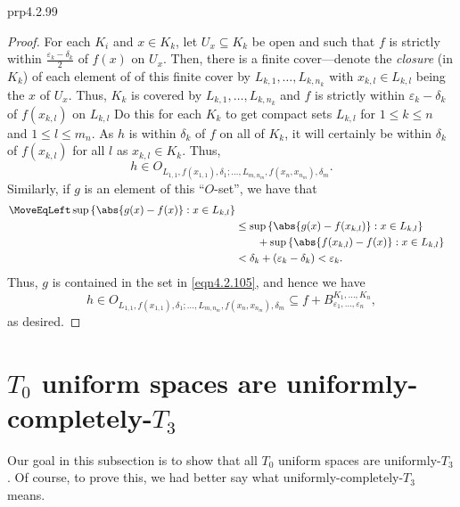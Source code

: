 \begin{prp}{}{prp4.2.99}
\begin{proof}
		For each $K_i$ and $x\in K_k$, let $U_x\subseteq K_k$ be open and such that $f$ is strictly within $\tfrac{\varepsilon _k-\delta _k}{2}$ of $f(x)$ on $U_x$.  Then, there is a finite cover---denote the \emph{closure} (in $K_k$) of each element of of this finite cover by $L_{k,1},\ldots ,L_{k,n_k}$ with $x_{k,l}\in L_{k,l}$ being the $x$ of $U_x$.  Thus, $K_k$ is covered by $L_{k,1},\ldots ,L_{k,n_k}$ and $f$ is strictly within $\varepsilon _k-\delta _k$ of $f(x_{k,l})$ on $L_{k,l}$  Do this for each $K_k$ to get compact sets $L_{k,l}$ for $1\leq k\leq n$ and $1\leq l\leq m_n$.  As $h$ is within $\delta _k$ of $f$ on all of $K_k$, it will certainly be within $\delta _k$ of $f(x_{k,l})$ for all $l$ as $x_{k,l}\in K_k$.  Thus,
		\begin{equation}\label{2.4.11}
			h\in O_{L_{1,1},f(x_{1,1}),\delta _1;\ldots ,L_{m,n_m},f(x_n,x_{n_m}),\delta _m}.
		\end{equation}
		Similarly, if $g$ is an element of this ``$O$-set'', we have that
		\begin{equation}
			\begin{split}
				\MoveEqLeft
				\sup \left\{ \abs{g(x)-f(x)}:x\in L_{k,l}\right\} \\
				& \leq \sup \left\{ \abs{g(x)-f(x_{k,l})}:x\in L_{k,l}\right\} \\ & \qquad +\sup \left\{ \abs{f(x_{k,l})-f(x)}:x\in L_{k,l}\right\} \\
				& <\delta _k+(\varepsilon _k-\delta _k)<\varepsilon _k.
			\end{split}
		\end{equation}
		Thus, $g$ is contained in the set in \eqref{eqn4.2.105}, and hence we have
		\begin{equation}
			h\in O_{L_{1,1},f(x_{1,1}),\delta _1;\ldots ,L_{m,n_m},f(x_n,x_{n_m}),\delta _m}\subseteq f+B_{\varepsilon _1,\ldots ,\varepsilon _n}^{K_1,\ldots ,K_n},
		\end{equation}
		as desired.
	\end{proof}
\end{prp}

\section{\texorpdfstring{$T_0$}{T0} uniform spaces are uniformly-completely-\texorpdfstring{$T_3$}{T3}}

Our goal in this subsection is to show that all $T_0$ uniform spaces are uniformly-$T_3$.  Of course, to prove this, we had better say what uniformly-completely-$T_3$ means.

